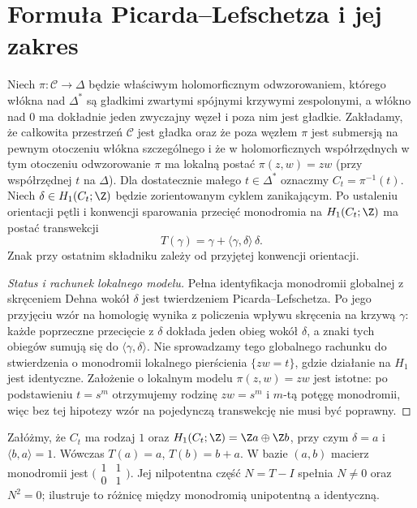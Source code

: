 \section{Formuła Picarda--Lefschetza i jej zakres}
\begin{twierdzenie}
\label{thm:picard-lefschetz-xiv}
Niech $\pi:\mathcal C\to\Delta$ będzie właściwym
holomorficznym odwzorowaniem, którego włókna nad
$\Delta^*$ są gładkimi zwartymi spójnymi
krzywymi zespolonymi, a włókno nad $0$
ma dokładnie jeden zwyczajny węzeł i poza nim
jest gładkie. Zakładamy, że całkowita przestrzeń
$\mathcal C$ jest gładka oraz że poza węzłem
$\pi$ jest submersją na pewnym otoczeniu włókna
szczególnego
i że w holomorficznych współrzędnych w tym otoczeniu
odwzorowanie $\pi$ ma lokalną postać
$\pi(z,w)=zw$ (przy współrzędnej $t$ na $\Delta$).
Dla dostatecznie małego $t\in\Delta^*$
oznaczmy $C_t=\pi^{-1}(t)$.
Niech $\delta\in H_1(C_t;\Z)$ będzie
zorientowanym cyklem zanikającym.
Po ustaleniu orientacji pętli i konwencji
sparowania przecięć monodromia na $H_1(C_t;\Z)$
ma postać transwekcji
\[
T(\gamma)=\gamma+\langle\gamma,\delta\rangle\,\delta.
\]
Znak przy ostatnim składniku zależy od
przyjętej konwencji orientacji.
\end{twierdzenie}
\begin{proof}[Status i rachunek lokalnego modelu]
Pełna identyfikacja monodromii globalnej z
skręceniem Dehna wokół $\delta$ jest twierdzeniem
Picarda--Lefschetza. Po jego przyjęciu wzór na
homologię wynika z policzenia wpływu skręcenia
na krzywą $\gamma$: każde poprzeczne przecięcie
z $\delta$ dokłada jeden obieg wokół $\delta$,
a znaki tych obiegów sumują się do
$\langle\gamma,\delta\rangle$.
Nie sprowadzamy tego globalnego rachunku do
stwierdzenia o monodromii lokalnego pierścienia
$\{zw=t\}$, gdzie działanie na $H_1$ jest identyczne.
Założenie o lokalnym modelu $\pi(z,w)=zw$ jest istotne:
po podstawieniu $t=s^m$ otrzymujemy rodzinę
$zw=s^m$ i $m$-tą potęgę monodromii, więc bez
tej hipotezy wzór na pojedynczą transwekcję
nie musi być poprawny.
\end{proof}
\begin{przyklad}
Załóżmy, że $C_t$ ma rodzaj $1$ oraz
$H_1(C_t;\Z)=\Z a\oplus\Z b$, przy czym
$\delta=a$ i $\langle b,a\rangle=1$.
Wówczas $T(a)=a$, $T(b)=b+a$.
W bazie $(a,b)$ macierz monodromii jest
$\bigl(\begin{smallmatrix}1&1\\0&1\end{smallmatrix}\bigr)$.
Jej nilpotentna część $N=T-I$ spełnia
$N\ne0$ oraz $N^2=0$; ilustruje to różnicę
między monodromią unipotentną a identyczną.
\end{przyklad}

